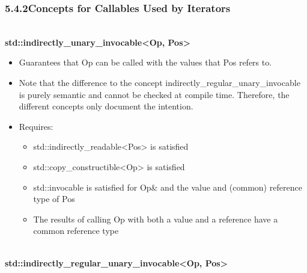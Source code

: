 \subsubsection*{ 5.4.2\hspace{0.2cm}Concepts for Callables Used by Iterators}

\noindent
\hspace*{\fill} \\ %
\textbf{std::indirectly\_unary\_invocable<Op, Pos>}

\begin{itemize}
\item
Guarantees that Op can be called with the values that Pos refers to.

\item
Note that the difference to the concept indirectly\_regular\_unary\_invocable is purely semantic and cannot be checked at compile time. Therefore, the different concepts only document the intention.

\item
Requires:
\begin{itemize}
\item
std::indirectly\_readable<Pos> is satisfied

\item
std::copy\_constructible<Op> is satisfied

\item
std::invocable is satisfied for Op\& and the value and (common) reference type of Pos

\item
The results of calling Op with both a value and a reference have a common reference type
\end{itemize}
\end{itemize}

\noindent
\hspace*{\fill} \\ %
\textbf{std::indirectly\_regular\_unary\_invocable<Op, Pos>}

